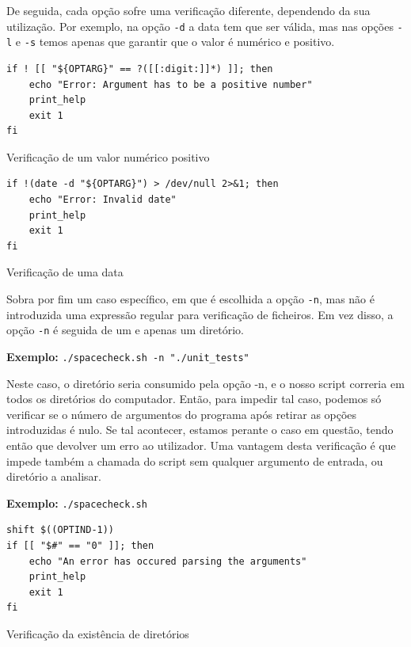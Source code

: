 De seguida, cada opção sofre uma verificação diferente,
dependendo da sua utilização. Por exemplo, na opção \verb|-d| a
data tem que ser válida, mas nas opções \verb|-l| e \verb|-s|
temos apenas que garantir que o valor é numérico e positivo.
\begin{listing}[H]
\begin{verbatim}
if ! [[ "${OPTARG}" == ?([[:digit:]]*) ]]; then
    echo "Error: Argument has to be a positive number"
    print_help
    exit 1
fi
\end{verbatim}
\caption{Verificação de um valor numérico positivo}
\end{listing}

\begin{listing}[H]
\begin{verbatim}
if !(date -d "${OPTARG}") > /dev/null 2>&1; then
    echo "Error: Invalid date"
    print_help
    exit 1
fi
\end{verbatim}
\caption{Verificação de uma data}
\end{listing}

Sobra por fim um caso específico, em que é escolhida a opção
\verb|-n|, mas não é introduzida uma expressão regular para
verificação de ficheiros. Em vez disso, a opção \verb|-n| é
seguida de um e apenas um diretório.
\begin{listing}[H]
    \centering
    \textbf{Exemplo:} \verb|./spacecheck.sh -n "./unit_tests"|
\end{listing}
Neste caso, o diretório seria consumido pela opção -n, e o
nosso script correria em todos os diretórios do computador. 
Então, para impedir tal caso, podemos só verificar se o número
de argumentos do programa após retirar as opções introduzidas é
nulo. Se tal acontecer, estamos perante o caso em questão,
tendo então que devolver um erro ao utilizador. 
Uma vantagem desta verificação é que impede também a chamada do
script sem qualquer argumento de entrada, ou diretório a analisar.
\begin{listing}[H]
    \centering
    \textbf{Exemplo:} \verb|./spacecheck.sh|
\end{listing}
\begin{listing}[H]
\begin{verbatim}
shift $((OPTIND-1))
if [[ "$#" == "0" ]]; then
    echo "An error has occured parsing the arguments"
    print_help
    exit 1
fi
\end{verbatim}
\caption{Verificação da existência de diretórios}
\end{listing}

